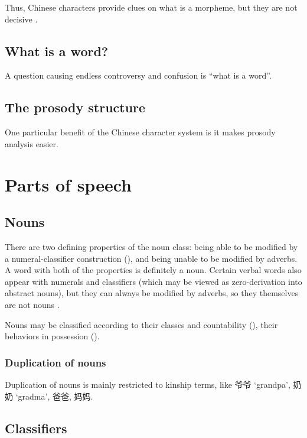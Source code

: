 \documentclass[UTF8, a4paper, oneside, scheme=plain]{ctexart}
\newcommand*{\citesec}[1]{\S~{#1}}
\newcommand{\translate}[1]{`#1'}
\begin{document}
Thus, Chinese characters provide clues on what is a morpheme,
but they are not decisive \citep[1.1.4]{zhudexigrammar}.

\subsection{What is a word?}

A question causing endless controversy and confusion 
is ``what is a word''. %

\subsection{The prosody structure}

One particular benefit of the Chinese character system is it makes prosody analysis easier.

\section{Parts of speech}

\subsection{Nouns}

There are two defining properties of the noun class:
being able to be modified by a numeral-classifier construction (),
and being unable to be modified by adverbs. %
A word with both of the properties is definitely a noun.
Certain verbal words also appear with numerals and classifiers 
(which may be viewed as zero-derivation into abstract nouns),
but they can always be modified by adverbs,
so they themselves are not nouns \citep[\citesec{4.1.1}]{zhudexigrammar}.

Nouns may be classified according to 
their classes and countability (),
their behaviors in possession ().

\subsubsection{Duplication of nouns}

Duplication of nouns is mainly restricted to kinship terms,
like 爷爷 \translate{grandpa}, 奶奶 \translate{gradma}, 爸爸, 妈妈.

\subsection{Classifiers}\label{sec:classifiers}
\end{document}
